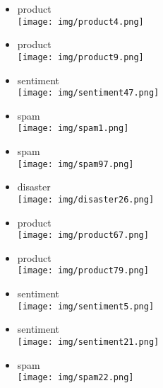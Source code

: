 \documentclass{article}
\theoremstyle{definition}
\theoremstyle{remark}
\begin{document}
\begin{landscape}
\begin{itemize}
    \item product\\\texttt{[image: img/product4.png]}
    \item product\\\texttt{[image: img/product9.png]}
    \item sentiment\\\texttt{[image: img/sentiment47.png]}
    \item spam\\\texttt{[image: img/spam1.png]}
    \item spam\\\texttt{[image: img/spam97.png]}
\end{itemize}

\newpage

\begin{itemize}
    \item disaster\\\texttt{[image: img/disaster26.png]}
    \item product\\\texttt{[image: img/product67.png]}
    \item product\\\texttt{[image: img/product79.png]}
    \item sentiment\\\texttt{[image: img/sentiment5.png]}
    \item sentiment\\\texttt{[image: img/sentiment21.png]}
    \item spam\\\texttt{[image: img/spam22.png]}
\end{itemize}

\newpage


\end{landscape}
\end{document}
